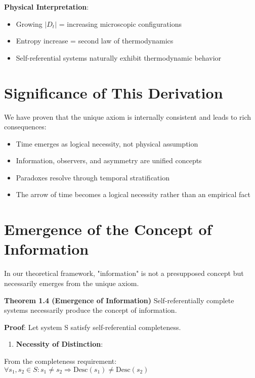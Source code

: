 \textbf{Physical Interpretation}:
\begin{itemize}
\item Growing $|D_t|$ = increasing microscopic configurations
\item Entropy increase = second law of thermodynamics
\item Self-referential systems naturally exhibit thermodynamic behavior
\end{itemize}

\section{Significance of This Derivation}
\label{sec:ch01_axiom_and_derivation:significance-of-this-derivation}

We have proven that the unique axiom is internally consistent and leads to rich consequences:

\begin{itemize}
\item Time emerges as logical necessity, not physical assumption
\item Information, observers, and asymmetry are unified concepts
\item Paradoxes resolve through temporal stratification
\item The arrow of time becomes a logical necessity rather than an empirical fact
\end{itemize}

\section{Emergence of the Concept of Information}
\label{sec:ch01_axiom_and_derivation:emergence-of-the-concept-of-information}

In our theoretical framework, "information" is not a presupposed concept but necessarily emerges from the unique axiom.

\textbf{Theorem 1.4 (Emergence of Information)}
\label{thm:1.4}
Self-referentially complete systems necessarily produce the concept of information.

\textbf{Proof}:
Let system S satisfy self-referential completeness.

\begin{enumerate}
\item \textbf{Necessity of Distinction}:
\end{enumerate}
  From the completeness requirement: $\forall s_1, s_2 \in S: s_1 \neq s_2 \Rightarrow \text{Desc}(s_1) \neq \text{Desc}(s_2)$
  
